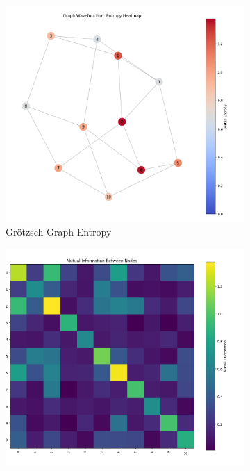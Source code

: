 \documentclass[12pt, letterpaper]{article}
\begin{document}
\begin{figure}[h!]
    \vspace{1cm}
    
    \begin{subfigure}[b]{0.48\textwidth}
        \includegraphics[width=\textwidth]{images/Groetzsch_Graph_Entropy_Map.png}
        \caption{Grötzsch Graph Entropy}
        \label{fig:groetzsch_entropy}
    \end{subfigure}
    \hfill
    \begin{subfigure}[b]{0.48\textwidth}
        \includegraphics[width=\textwidth]{images/Groetzsch_Graph_Mutal_Info_Matrix.png}

\end{subfigure}
\end{figure}
\end{document}
